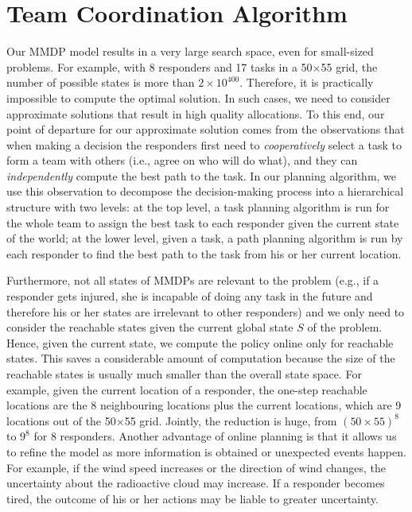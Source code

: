 \section{Team Coordination Algorithm}\label{sec:algo}
\noindent Our  MMDP model results in a very large search space,
even for small-sized problems. For example, with 8 responders and
17 tasks in a 50$\times$55 grid, the number of possible states is
more than $2\times 10^{400}$. Therefore, it is practically
impossible to compute the optimal solution. In such cases, we need
to consider approximate solutions that result in high quality
allocations.  To this end, our point of departure for our
approximate solution comes from the observations that when making a
decision the responders first need to {\em cooperatively} select a
task to form a team with others (i.e., agree on who will do what),
and they can {\em independently} compute the best path to the task.
In our planning algorithm, we use this observation to decompose the
decision-making process into a hierarchical structure with two
levels: at the top level, a task planning algorithm is run for the
whole team to assign the best task to each responder given the
current state of the world; at the lower level, given a task, a
path planning algorithm is run by each responder to find the best
path to the task from his or her current location.

Furthermore, not all states of MMDPs are relevant to the problem
(e.g., if a responder gets injured, she is incapable of doing any
task in the future and therefore his or her states are irrelevant
to other responders) and we only need to consider the reachable
states given the current global state $S$ of the problem. Hence,
given the current state, we compute the policy online only for
reachable states. This saves a considerable amount of computation
because the size of the reachable states is usually much smaller
than the overall state space. For example, given the current
location of a responder, the one-step reachable locations are the 8
neighbouring locations plus the current locations, which are 9
locations out of the 50$\times$55 grid. Jointly, the reduction is
huge, from $(50\times 55)^8$ to $9^8$ for 8 responders. Another
advantage of online planning is that it allows us to refine the
model as more information is obtained or unexpected events happen.
For example, if the wind speed increases or the direction of wind
changes, the uncertainty about the radioactive cloud may increase.
If a responder becomes tired, the outcome of his or her actions may
be liable to greater uncertainty.

